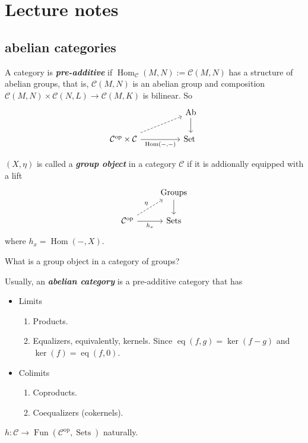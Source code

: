 \documentclass{article}
\newcommand{\Cc}{\mathcal{C}}
\DeclareMathOperator{\Hom}{Hom}
\DeclareMathOperator{\Set}{Set}
\DeclareMathOperator{\Sets}{Sets}
\DeclareMathOperator{\Ab}{Ab}
\DeclareMathOperator{\op}{op}
\DeclareMathOperator{\Groups}{Groups}
\DeclareMathOperator{\eq}{eq}
\DeclareMathOperator{\Fun}{Fun}
\begin{document}
\section{Lecture notes}
\subsection{abelian categories}
\begin{defn}
	A category is \textbf{\textit{pre-additive}} if $\Hom_\Cc(M,N):=\Cc(M,N)$ has a structure of abelian groups, that is, $\Cc(M,N)$ is an abelian group and composition $\Cc(M,N)\times\Cc(N,L)\to\Cc(M,K)$ is bilinear. So
	\[\begin{tikzcd}[column sep=huge]
		&\Ab\arrow[d]\\
	\Cc^{\op}\times\Cc\arrow[r,"\Hom(-\text{,}-)",swap]\arrow[ur,dashed]&\Set
\	\end{tikzcd}\]
\end{defn}
\begin{defn}
	$(X,\eta)$ is called a \textbf{\textit{group object}} in a category $\Cc$ if it is addionally equipped with a lift
	\[\begin{tikzcd}
		&\Groups\arrow[d]\\		\Cc^{\op}\arrow[r,"h_x",swap]\arrow[ur,"\eta",dashed]&\Sets
	\end{tikzcd}\]
	where $h_x=\Hom(-,X)$.
\end{defn}
\begin{exercise}
	What is a group object in a category of groups?
\end{exercise}
\begin{defn}
	Usually, an \textbf{\textit{abelian category}} is a pre-additive category that has
	\begin{itemize}
		\item Limits
		\begin{enumerate}
			\item Products.
			\item Equalizers, equivalently, kernels. Since $\eq(f,g)=\ker(f-g)$ and $\ker(f)=\eq(f,0)$.
		\end{enumerate}
		\item Colimits
		\begin{enumerate}
			\item Coproducts.
			\item Coequalizers (cokernels).
		\end{enumerate}
	\end{itemize}
\end{defn}
\begin{lemma}[Yoneda]
	$h:\Cc\to\Fun(\Cc^{\op},\Sets)$ naturally.
\end{lemma}
\end{document}
